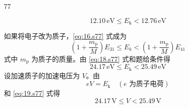 \begin{solution}{77}
\begin{subsolution}
\begin{equation}
            12.10\,\mathrm{eV} \leq E_{\mathrm{k}} < 12.76\,\mathrm{eV}
            \label{eq:17.s77}
        \end{equation}
    \end{subsolution}
    \begin{subsolution}
        如果将电子改为质子，\eqref{eq:16.s77} 式成为
        \begin{equation}
            \left(1 + \frac{m_{\mathrm{p}}}{M}\right) E_{31} \leq E_{k} < \left(1 + \frac{m_{\mathrm{p}}}{M}\right) E_{41}
            \label{eq:18.s77}
        \end{equation}
        式中 $m_{\mathrm{p}}$ 为质子的质量。由 \eqref{eq:18.s77} 式和题给条件得
        \begin{equation}
            24.17\,\mathrm{eV} \leq E_{\mathrm{k}} < 25.49\,\mathrm{eV}
            \label{eq:19.s77}
        \end{equation}
        设加速质子的加速电压为 $V$。由
        \begin{equation}
            e V = E_{\mathrm{k}} \quad (e \text{ 为质子电荷})
        \end{equation}
        和 \eqref{eq:19.s77} 式得
        \begin{equation}
            24.17\,\mathrm{V} \leq V < 25.49\,\mathrm{V}
            \label{eq:20.s77}
        \end{equation}
    \end{subsolution}
\end{solution}